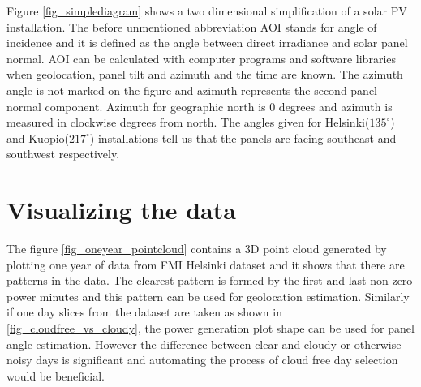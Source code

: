 \noindent
Figure \ref{fig_simplediagram} shows a two dimensional simplification of a solar PV installation. The before unmentioned abbreviation AOI stands for angle of incidence and it is defined as the angle between direct irradiance and solar panel normal. AOI can be calculated with computer programs and software libraries when geolocation, panel tilt and azimuth and the time are known. The azimuth angle is not marked on the figure and azimuth represents the second panel normal component. Azimuth for geographic north is 0 degrees and azimuth is measured in clockwise degrees from north. The angles given for Helsinki($135^\circ$) and Kuopio($217^\circ$) installations tell us that the panels are facing southeast and southwest respectively. 



\section{Visualizing the data}
The figure \ref{fig_oneyear_pointcloud} contains a 3D point cloud generated by plotting one year of data from FMI Helsinki dataset and it shows that there are patterns in the data. The clearest pattern is formed by the first and last non-zero power minutes and this pattern can be used for geolocation estimation. Similarly if one day slices from the dataset are taken as shown in \ref{fig_cloudfree_vs_cloudy}, the power generation plot shape can be used for panel angle estimation. However the difference between clear and cloudy or otherwise noisy days is significant and automating the process of cloud free day selection would be beneficial.











